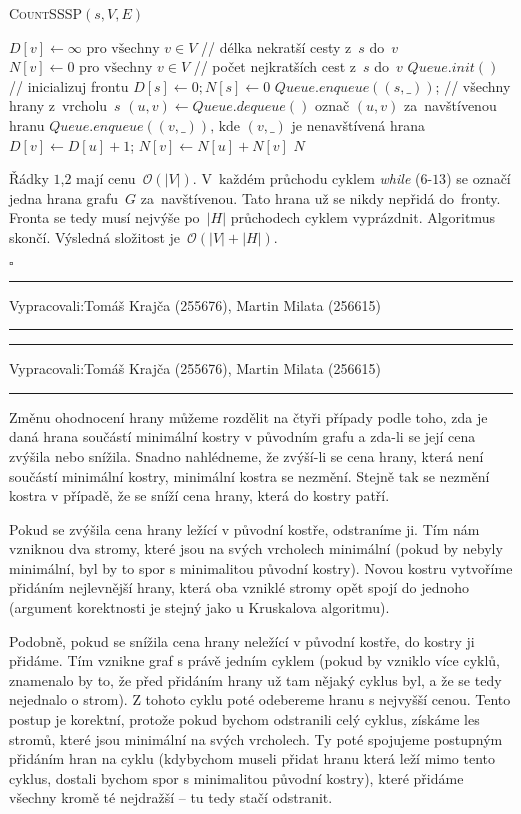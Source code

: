 \documentclass[12pt]{article}
\newcommand{\la}{\leftarrow}
\renewcommand{\O}{\mathcal{O}}
\newcommand{\zadani}[2]{
{\large
\noindent {\bf IB108 \hfill{} Sada #1, Příklad #2 \\[-4mm]}
\noindent\hrule
\vspace{2mm}
\noindent Vypracovali:\hfill{}Tomáš Krajča (255676), Martin Milata (256615)
\vspace{3mm}
\hrule
\bigskip\bigskip}
}
\begin{document}
\begin{algorithm}
\textsc{CountSSSP}$(s, V, E)$
\begin{algorithmic}[1]
\STATE $D[v] \la \infty \mbox{ pro všechny } v \in V$ // délka nekratší cesty z~$s$ do~$v$
\STATE $N[v] \la 0 \mbox{ pro všechny } v \in V$ // počet nejkratších cest z~$s$ do~$v$
\STATE $Queue.init()$ // inicializuj frontu
\STATE $D[s] \la 0; N[s] \la 0$
\STATE $Queue.enqueue((s,\_))$; // všechny hrany z~vrcholu~$s$
\STATE $(u,v) \la Queue.dequeue()$
\STATE označ $(u,v)$ za~navštívenou hranu
\STATE $Queue.enqueue((v,\_)) \mbox{, kde } (v,\_)$ je nenavštívená hrana
\STATE $D[v] \la D[u]+1$; $N[v] \la N[u] + N[v]$
\ENDIF
\ENDWHILE
\RETURN $N$
\end{algorithmic}
\end{algorithm}
Řádky $1$,$2$ mají cenu~$\O(|V|)$. V~každém průchodu cyklem
\textit{while} ($6$-$13$) se označí jedna hrana grafu~$G$ za~navštívenou. Tato
hrana už se nikdy nepřidá do~fronty. Fronta se tedy musí nejvýše po~$|H|$
průchodech cyklem vyprázdnit. Algoritmus skončí. Výsledná složitost je~$\O(|V|+|H|)$.

\hfill$\square$

\clearpage
\zadani{3}{3}

\clearpage
\zadani{3}{4}

\noindent
Změnu ohodnocení hrany můžeme rozdělit na čtyři případy podle toho, zda je daná hrana součástí
minimální kostry v původním grafu a zda-li se její cena zvýšila nebo snížila.  Snadno nahlédneme, že
zvýší-li se cena hrany, která není součástí minimální kostry, minimální kostra se nezmění. Stejně
tak se nezmění kostra v případě, že se sníží cena hrany, která do kostry patří.

Pokud se zvýšila cena hrany ležící v původní kostře, odstraníme ji. Tím nám vzniknou dva stromy,
které jsou na svých vrcholech minimální
(pokud by nebyly minimální, byl by to spor s minimalitou původní kostry). Novou kostru
vytvoříme přidáním nejlevnější hrany, která oba vzniklé stromy opět spojí do jednoho (argument
korektnosti je stejný jako u Kruskalova algoritmu).

Podobně, pokud se snížila cena hrany neležící v původní kostře, do kostry ji přidáme. Tím vznikne graf
s právě jedním cyklem (pokud by vzniklo více cyklů, znamenalo by to, že před přidáním hrany už tam nějaký
cyklus byl, a že se tedy nejednalo o strom). Z tohoto cyklu poté odebereme hranu s nejvyšší cenou. Tento
postup je korektní, protože pokud bychom odstranili celý cyklus, získáme les stromů, které jsou
minimální na svých vrcholech.
Ty poté spojujeme postupným přidáním hran na cyklu (kdybychom museli přidat hranu která leží mimo
tento cyklus, dostali bychom spor s minimalitou původní kostry), které přidáme všechny kromě té nejdražší
-- tu tedy stačí odstranit.
\end{document}
